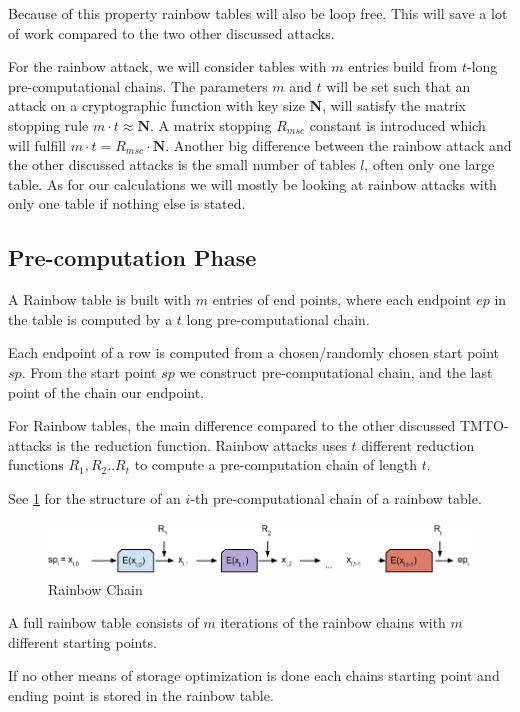 Because of this property rainbow tables will also be loop free. This
will save a lot of work compared to the two other discussed attacks.

For the rainbow attack, we will consider tables with $m$ entries build
from $t$-long pre-computational chains. The parameters $m$ and $t$
will be set such that an attack on a cryptographic
function with key size \textbf{N}, will satisfy the matrix
stopping rule $m \cdot t \approx \textbf{N}$. A matrix stopping $R_{msc}$
constant is introduced which will fulfill $m\cdot t = R_{msc} \cdot
\textbf{N}$. Another big difference between the rainbow attack and the
other discussed attacks is the small number of tables $l$, often only
one large table. As for our calculations we will mostly be looking at
rainbow attacks with only one table if nothing else is stated.

\subsection{Pre-computation Phase}

A Rainbow table is built with $m$ entries of end points, where each endpoint
$ep$ in the table is computed by a $t$ long pre-computational chain.

Each endpoint of a row is computed from a chosen/randomly chosen
start point $sp$. From the start point $sp$ we construct pre-computational chain,
and the last point of the chain our endpoint.

For Rainbow tables, the main difference compared to the other
discussed TMTO-attacks is the reduction function. Rainbow attacks
uses $t$ different reduction functions $R_1,R_2..R_t$ to compute a pre-computation
chain of length $t$.

See \ref{fig:rainbowchain} for the structure of an $i$-th
pre-computational chain of a rainbow table.
\begin{figure}[H]
  \centering
  \includegraphics[scale=0.4]{figures/rainbowchain.png}
  \caption{Rainbow Chain}
  \label{fig:rainbowchain}
\end{figure}

A full rainbow table consists of $m$ iterations of the rainbow chains
with $m$ different starting points.

If no other means of storage optimization is done each chains
starting point and ending point is stored in the rainbow table.

